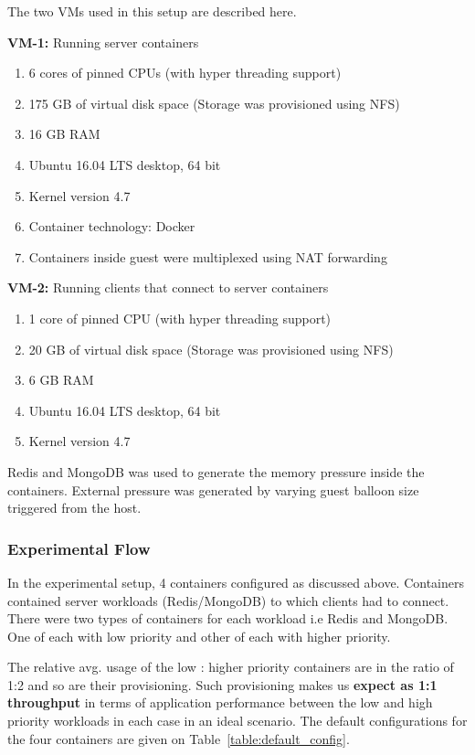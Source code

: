	The two VMs used in this setup are described here.
	
	\noindent \textbf{VM-1:} Running server containers
	\begin{enumerate}
	  \item 6 cores of pinned CPUs (with hyper threading support)
	  \item 175 GB of virtual disk space (Storage was provisioned using NFS)
	  \item 16 GB RAM
	  \item Ubuntu 16.04 LTS desktop, 64 bit
	  \item Kernel version 4.7
	  \item Container technology: Docker
	  \item Containers inside guest were multiplexed using NAT forwarding
	\end{enumerate}
	
	\noindent \textbf{VM-2:} Running clients that connect to server containers
	\begin{enumerate}
	  \item 1 core of pinned CPU (with hyper threading support)
	  \item 20 GB of virtual disk space (Storage was provisioned using NFS)
	  \item 6 GB RAM
	  \item Ubuntu 16.04 LTS desktop, 64 bit
	  \item Kernel version 4.7
	\end{enumerate}
	
	Redis and MongoDB was used to generate the memory pressure inside the containers. External pressure was generated by varying guest 
balloon size triggered from the host.

      
    \subsubsection{Experimental Flow}
      
      In the experimental setup, 4 containers configured as discussed above. Containers contained server 
    workloads (Redis/MongoDB) to which clients had to connect. There were two types of containers for each workload i.e Redis and MongoDB. One 
    of each with low priority and other of each with higher priority. 

    The relative avg. usage of the low : higher priority containers are in the ratio of 1:2 and so are their provisioning. Such provisioning 
    makes us \textbf{expect as 1:1 throughput} in terms of application performance between the low and high priority workloads in each case in 
    an ideal scenario. The default configurations for the four containers are given on Table~\ref{table:default_config}.

